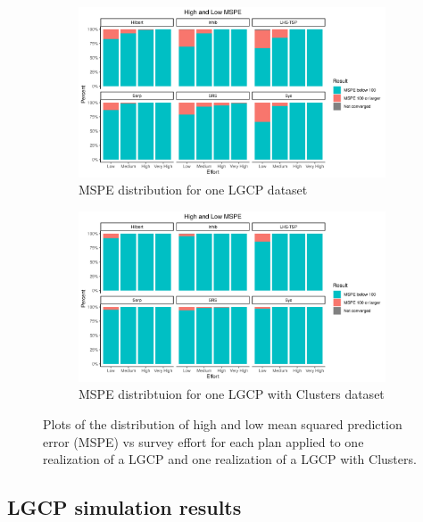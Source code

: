 \documentclass[review]{elsarticle}
\begin{document}
\begin{figure}

\begin{subfigure}{5in}
\includegraphics[width=5in]{../graphics/HighMSPE-LGCP000004.png}
\caption{MSPE distribution for one LGCP dataset}
\label{highmspelgcp}
\end{subfigure}

\begin{subfigure}{5in}
\includegraphics[width=5in]{../graphics/HighMSPE-Cluster000004.png}
\caption{MSPE distribtuion for one LGCP with Clusters dataset}
\label{highmspecluster}
\end{subfigure}

\caption{Plots of the distribution of high and low mean squared prediction
error (MSPE) vs survey effort for each plan applied to one realization of a
LGCP and one realization of a LGCP with Clusters.}
\label{histmsperesults}
\end{figure}


\subsection{LGCP simulation results}
\end{document}
